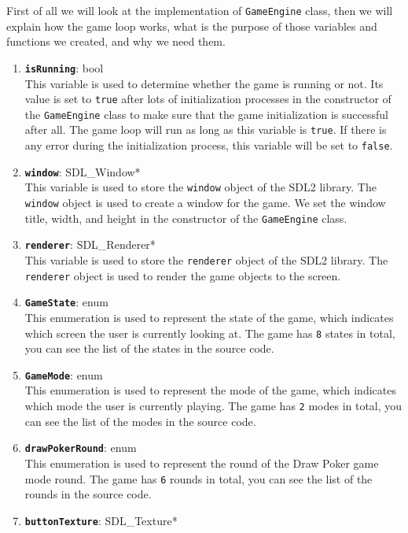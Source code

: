 \hspace{1cm} First of all we will look at the implementation of \texttt{GameEngine} class, then we will explain how the game loop works, what is the purpose of those variables and functions we created, and why we need them.
\begin{enumerate}
    \item \textbf{\texttt{isRunning}}: bool 
    \\ This variable is used to determine whether the game is running or not. Its value is set to \texttt{true} after lots of initialization processes in the constructor of the \texttt{GameEngine} class to make sure that the game initialization is successful after all. The game loop will run as long as this variable is \texttt{true}. If there is any error during the initialization process, this variable will be set to \texttt{false}.
    \item \textbf{\texttt{window}}: SDL\_Window*
    \\ This variable is used to store the \texttt{window} object of the SDL2 library. The \texttt{window} object is used to create a window for the game. We set the window title, width, and height in the constructor of the \texttt{GameEngine} class.
    \item \textbf{\texttt{renderer}}: SDL\_Renderer* \\ This variable is used to store the \texttt{renderer} object of the SDL2 library. The \texttt{renderer} object is used to render the game objects to the screen.
    \item \textbf{\texttt{GameState}}: enum
    \\ This enumeration is used to represent the state of the game, which indicates which screen the user is currently looking at. The game has \texttt{8} states in total, you can see the list of the states in the source code.
    \item \textbf{\texttt{GameMode}}: enum
    \\ This enumeration is used to represent the mode of the game, which indicates which mode the user is currently playing. The game has \texttt{2} modes in total, you can see the list of the modes in the source code.
    \item \textbf{\texttt{drawPokerRound}}: enum
    \\ This enumeration is used to represent the round of the Draw Poker game mode round. The game has \texttt{6} rounds in total, you can see the list of the rounds in the source code.
    \item \textbf{\texttt{buttonTexture}}: SDL\_Texture*

\end{enumerate}
